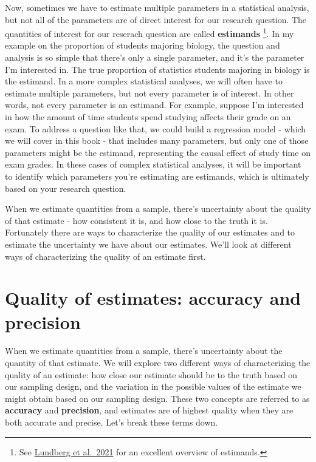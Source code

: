 \documentclass[
]{book}
\begin{document}
Now, sometimes we have to estimate multiple parameters in a statistical analysis, but not all of the parameters are of direct interest for our research question. The quantities of interest for our reserach question are called \textbf{estimands} \footnote{See \href{https://journals.sagepub.com/doi/abs/10.1177/00031224211004187?journalCode=asra}{Lundberg et al.~2021} for an excellent overview of estimands.}. In my example on the proportion of students majoring biology, the question and analysis is so simple that there's only a single parameter, and it's the parameter I'm interested in. The true proportion of statistics students majoring in biology is the estimand. In a more complex statistical analyses, we will often have to estimate multiple parameters, but not every parameter is of interest. In other words, not every parameter is an estimand. For example, suppose I'm interested in how the amount of time students spend studying affects their grade on an exam. To address a question like that, we could build a regression model - which we will cover in this book - that includes many parameters, but only one of those parameters might be the estimand, representing the causal effect of study time on exam grades. In these cases of complex statistical analyses, it will be important to identify which parameters you're estimating are estimands, which is ultimately based on your research question.

When we estimate quantities from a sample, there's uncertainty about the quality of that estimate - how consistent it is, and how close to the truth it is. Fortunately there are ways to characterize the quality of our estimates and to estimate the uncertainty we have about our estimates. We'll look at different ways of characterizing the quality of an estimate first.

\section{Quality of estimates: accuracy and precision}\label{quality-of-estimates-accuracy-and-precision}

When we estimate quantities from a sample, there's uncertainty about the quantity of that estimate. We will explore two different ways of characterizing the quality of an estimate: how close our estimate should be to the truth based on our sampling design, and the variation in the possible values of the estimate we might obtain based on our sampling design. These two concepts are referred to as \textbf{accuracy} and \textbf{precision}, and estimates are of highest quality when they are both accurate and precise. Let's break these terms down.
\end{document}
